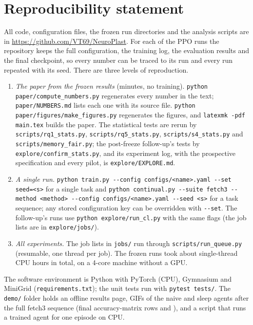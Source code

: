 \documentclass[10pt]{article}
\newif\ifanonymous
\newcommand{\repourl}{\ifanonymous an anonymised repository provided as supplementary material\else
  \url{https://github.com/VT69/NeuroPlast}\fi}
\begin{document}
\section*{Reproducibility statement}
\label{sec:reproducibility}
All code, configuration files, the frozen run directories and the analysis scripts are in \repourl. For each of the
\computeRuns PPO runs the repository keeps the full configuration, the training log, the evaluation results and the
final checkpoint, so every number can be traced to its run and every run repeated with its seed. There are three
levels of reproduction.
\begin{enumerate}
  \item \emph{The paper from the frozen results} (minutes, no training). \texttt{python paper/compute\_numbers.py}
        regenerates every number in the text; \texttt{paper/NUMBERS.md} lists each one with its source file.
        \texttt{python paper/figures/make\_figures.py} regenerates the figures, and \texttt{latexmk -pdf main.tex}
        builds the paper. The statistical tests are rerun by \texttt{scripts/rq1\_stats.py},
        \texttt{scripts/rq5\_stats.py}, \texttt{scripts/s4\_stats.py} and \texttt{scripts/memory\_fair.py}; the
        post-freeze follow-up's tests by \texttt{explore/confirm\_stats.py}, and its experiment log, with the
        prospective specification and every pilot, is \texttt{explore/EXPLORE.md}.
  \item \emph{A single run.} \texttt{python train.py -{}-config configs/<name>.yaml -{}-set seed=<s>} for a single task and
        \texttt{python continual.py -{}-suite fetch3 -{}-method <method> -{}-config configs/<name>.yaml -{}-seed <s>} for a
        task sequence; any stored configuration key can be overridden with \texttt{-{}-set}. The follow-up's runs use
        \texttt{python explore/run\_cl.py} with the same flags (the job lists are in \texttt{explore/jobs/}).
  \item \emph{All experiments.} The job lists in \texttt{jobs/} run through \texttt{scripts/run\_queue.py} (resumable,
        one thread per job). The frozen runs took about \computeCoreHours single-thread CPU hours in total, on a
        4-core machine without a GPU.
\end{enumerate}
The software environment is Python with PyTorch (CPU), Gymnasium and MiniGrid (\texttt{requirements.txt}); the unit
tests run with \texttt{pytest tests/}. The \texttt{demo/} folder holds an offline results page, GIFs of the naive and
sleep agents after the full fetch3 sequence (final accuracy-matrix rows \demoNaiveRow and \demoSleepRow), and a script
that runs a trained agent for one episode on CPU.
\end{document}
